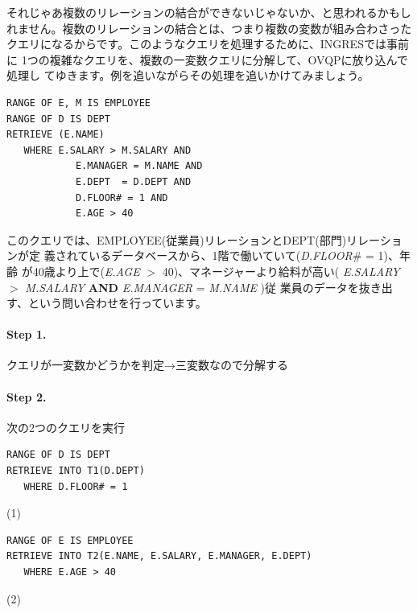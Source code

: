 それじゃあ複数のリレーションの結合ができないじゃないか、と思われるかもし
れません。複数のリレーションの結合とは、つまり複数の変数が組み合わさった
クエリになるからです。このようなクエリを処理するために、INGRESでは事前に
1つの複雑なクエリを、複数の一変数クエリに分解して、OVQPに放り込んで処理し
てゆきます。例を追いながらその処理を追いかけてみましょう。


\begin{center}
 \begin{minipage}{0.8\textwidth}
  \begin{lstlisting}
RANGE OF E, M IS EMPLOYEE
RANGE OF D IS DEPT
RETRIEVE (E.NAME)
   WHERE E.SALARY > M.SALARY AND
            E.MANAGER = M.NAME AND
            E.DEPT  = D.DEPT AND
            D.FLOOR# = 1 AND
            E.AGE > 40
  \end{lstlisting}
 \end{minipage}
\end{center}

このクエリでは、EMPLOYEE(従業員)リレーションとDEPT(部門)リレーションが定
義されているデータベースから、1階で働いていて({\it D.FLOOR}\# = 1)、年齢
が40歳より上で({\it E.AGE} $>$ 40)、マネージャーより給料が高い({\it
E.SALARY} $>$ {\it M.SALARY} {\bf AND} {\it E.MANAGER} = {\it M.NAME} )従
業員のデータを抜き出す、という問い合わせを行っています。

\paragraph{Step 1. }
クエリが一変数かどうかを判定→三変数なので分解する

\paragraph{Step 2. }
次の2つのクエリを実行

\begin{center}
 \begin{minipage}{0.8\textwidth}
  \begin{lstlisting}
RANGE OF D IS DEPT
RETRIEVE INTO T1(D.DEPT)
   WHERE D.FLOOR# = 1
  \end{lstlisting}
 \end{minipage}
 \begin{minipage}{0.05\textwidth}
  (1)
 \end{minipage}

 \begin{minipage}{0.8\textwidth}
  \begin{lstlisting}
RANGE OF E IS EMPLOYEE
RETRIEVE INTO T2(E.NAME, E.SALARY, E.MANAGER, E.DEPT)
   WHERE E.AGE > 40
  \end{lstlisting}
 \end{minipage}
 \begin{minipage}{0.05\textwidth}
  (2)
 \end{minipage}
\end{center}

